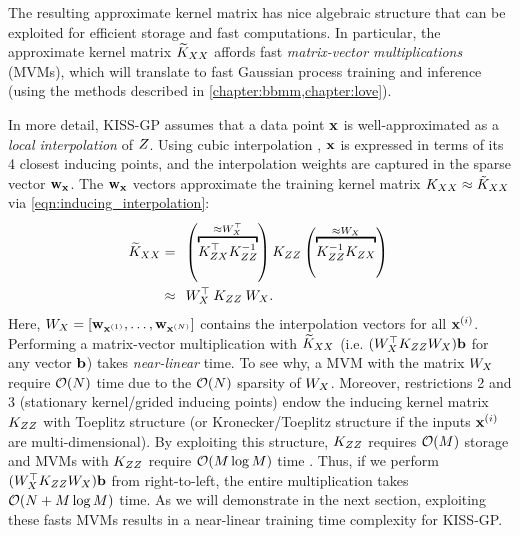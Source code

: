 The resulting approximate kernel matrix has nice algebraic structure that can be exploited for efficient storage and fast computations.
In particular, the approximate kernel matrix $\widetilde {K}_{XX}$ affords fast \emph{matrix-vector multiplications} (MVMs), which will translate to fast Gaussian process training and inference (using the methods described in \cref{chapter:bbmm,chapter:love}).

In more detail, KISS-GP assumes that a data point $\mathbf{x}$ is well-approximated as a \emph{local interpolation} of $Z$.
Using cubic interpolation \cite{keys1981cubic}, $\mathbf{x}$ is expressed in terms of its 4 closest inducing points, and the interpolation weights are captured in the sparse vector $\mathbf{w}_{\mathbf{x}}$.
The $\mathbf{w}_{\mathbf{x}}$ vectors approximate the training kernel matrix $K_{XX} \approx \tilde {K}_{XX}$ via \cref{eqn:inducing_interpolation}:
%
\begin{align}
  \widetilde \bK_{\bX\bX} &= \:\:
    \left( \overbracket{ \bK_{\bZ\bX}^\top \bK_{\bZ\bZ}^{-1} }^{ \approx \bW_{\bX}^\top} \right)
    \bK_{\bZ\bZ}
    \left( \overbracket{ \bK_{\bZ\bZ}^{-1} \bK_{\bZ\bX} }^{ \approx \bW_{\bX}} \right)
  \nonumber{} \\
  &\approx \:\: \bW_{\bX}^\top \: \bK_{\bZ\bZ} \: \bW_{\bX}.
  \label{eqn:ski}
\end{align}
%
Here, $W_{X} = [\mathbf{w}_{\mathbf{x}^{(1)}}, \ldots, \mathbf{w}_{\mathbf{x}^{(N)}}]$ contains the interpolation vectors for all $\mathbf{x}^{(i)}$.
Performing a matrix-vector multiplication with $\widetilde {K}_{XX}$ (i.e. $( W_{X}^\top K_{ZZ} W_{X}) \mathbf{b}$ for any vector $\mathbf{b}$) takes \emph{near-linear} time.
To see why, a MVM with the matrix $W_{X}$ require $\bigo{N}$ time due to the $\bigo{N}$ sparsity of $W_{X}$.
Moreover, restrictions 2 and 3 (stationary kernel/grided inducing points) endow the inducing kernel matrix $K_{ZZ}$ with Toeplitz structure (or Kronecker/Toeplitz structure if the inputs $\mathbf{x}^{(i)}$ are multi-dimensional).
By exploiting this structure, $K_{ZZ}$ requires $\bigo{M}$ storage and MVMs with $K_{ZZ}$ require $\bigo{M \log M}$ time \citep[see][for details]{cunningham2008fast,saatcci2012scalable}.
Thus, if we perform $( W_{X}^\top K_{ZZ} W_{X}) \mathbf{b}$ from right-to-left, the entire multiplication takes $\bigo{N + M \log M}$ time.
As we will demonstrate in the next section, exploiting these fasts MVMs results in a near-linear training time complexity for KISS-GP.

%
